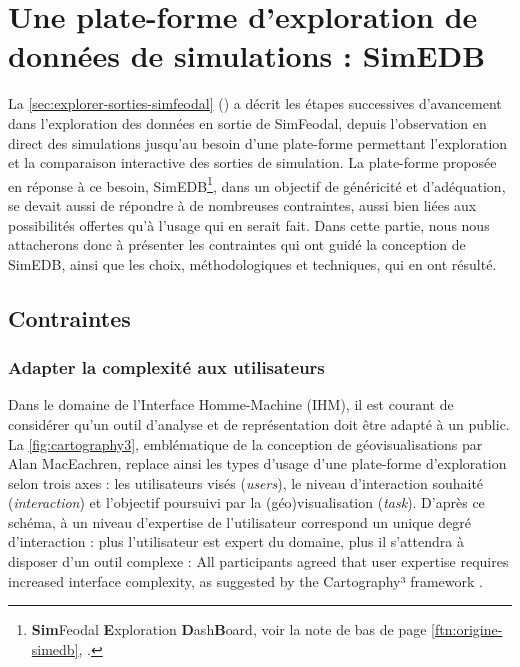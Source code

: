 \clearpage
\section[Une plate-forme d'exploration de données de simulations : SimEDB]{Une plate-forme d'exploration de données de simulations : SimEDB%
}\label{sec:SimEDB}

La \cref{sec:explorer-sorties-simfeodal} () a décrit les étapes successives d'avancement dans l'exploration des données en sortie de SimFeodal, depuis l'observation en direct des simulations jusqu'au besoin d'une plate-forme permettant l'exploration et la comparaison interactive des sorties de simulation.
La plate-forme proposée en réponse à ce besoin, SimEDB\footnote{
\textbf{Sim}Feodal \textbf{E}xploration \textbf{D}ash\textbf{B}oard, voir la note de bas de page \ref{ftn:origine-simedb}, .
}, dans un objectif de généricité et d'adéquation, se devait aussi de répondre à de nombreuses contraintes, aussi bien liées aux possibilités offertes qu'à l'usage qui en serait fait.
Dans cette partie, nous nous attacherons donc à présenter les contraintes qui ont guidé la conception de SimEDB, ainsi que les choix, méthodologiques et techniques, qui en ont résulté.

\subsection{Contraintes}

\subsubsection{Adapter la complexité aux utilisateurs}

Dans le domaine de l'Interface Homme-Machine (IHM), il est courant de considérer qu'un outil d'analyse et de représentation doit être adapté à un public. La \cref{fig:cartography3}, emblématique de la conception de géovisualisations par Alan MacEachren, replace ainsi les types d'usage d'une plate-forme d'exploration selon trois axes : les utilisateurs visés (\textit{users}), le niveau d'interaction souhaité (\textit{interaction}) et l'objectif poursuivi par la (géo)visualisation (\textit{task}).
D'après ce schéma, à un niveau d'expertise de l'utilisateur correspond un unique degré d'interaction : plus l'utilisateur est expert du domaine, plus il s'attendra à disposer d'un outil complexe : \og All participants agreed that user expertise requires increased interface complexity, as suggested by the Cartography³ framework\fg{} \autocite[16]{roth_interactivity_2015}.

